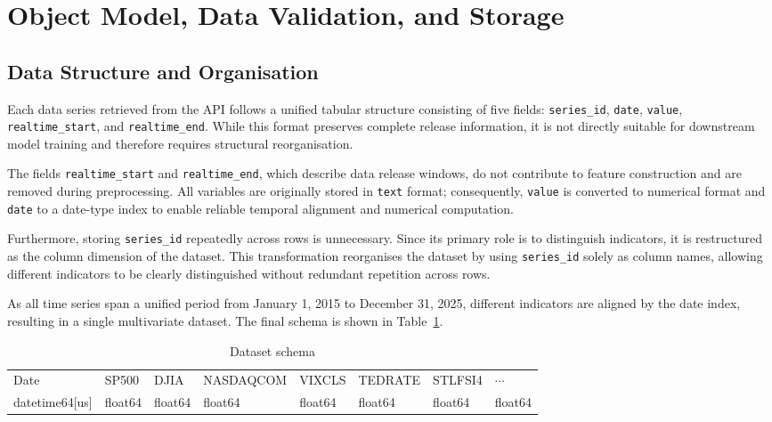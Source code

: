 \documentclass[10pt]{article} %
\begin{document}
\section{Object Model, Data Validation, and Storage}

\subsection{Data Structure and Organisation}

Each data series retrieved from the API follows a unified tabular structure consisting of five fields: \texttt{series\_id}, \texttt{date}, \texttt{value}, \texttt{realtime\_start}, and \texttt{realtime\_end}. While this format preserves complete release information, it is not directly suitable for downstream model training and therefore requires structural reorganisation.

The fields \texttt{realtime\_start} and \texttt{realtime\_end}, which describe data release windows, do not contribute to feature construction and are removed during preprocessing. All variables are originally stored in \texttt{text} format; consequently, \texttt{value} is converted to numerical format and \texttt{date} to a date-type index to enable reliable temporal alignment and numerical computation.

Furthermore, storing \texttt{series\_id} repeatedly across rows is unnecessary. Since its primary role is to distinguish indicators, it is restructured as the column dimension of the dataset. This transformation reorganises the dataset by using \texttt{series\_id} solely as column names, allowing different indicators to be clearly distinguished without redundant repetition across rows.


As all time series span a unified period from January 1, 2015 to December 31, 2025, different indicators are aligned by the date index, resulting in a single multivariate dataset. The final schema is shown in Table~\ref{tab:dataset_schema}.

\begin{table}[h]
\centering
\caption{Dataset schema}
\label{tab:dataset_schema}
\begin{tabular}{l l l l l l l l}
\hline
Date & SP500 & DJIA & NASDAQCOM & VIXCLS & TEDRATE & STLFSI4 & $\cdots$ \\
datetime64[us] & float64 & float64 & float64 & float64 & float64 & float64 & float64 \\
\hline
\end{tabular}
\end{table}
\end{document}
